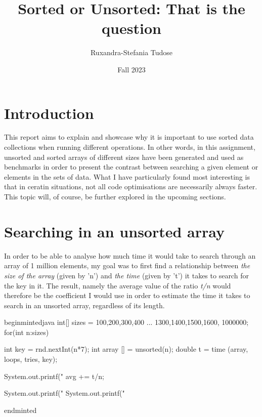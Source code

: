 \documentclass[a4paper,11pt]{article}
\begin{document}
\title{
    \textbf{Sorted or Unsorted: That is the question}
}
\author{Ruxandra-Stefania Tudose}
\date{Fall 2023}

\maketitle

\section*{Introduction}

This report aims to explain and showcase why it is important to use sorted data collections when running different operations. 
In other words, in this assignment, unsorted and sorted arrays of different sizes have been generated and used as benchmarks in order 
to present the contrast between searching a given element or 
elements in the sets of data. What I have particularly found most interesting is that 
in ceratin situations, not all code optimisations are necessarily always faster. This topic will, of course, be further explored in the upcoming sections. 

\section*{Searching in an unsorted array}

In order to be able to analyse how much time it would take to search through an array of 1 million elements, my goal 
was to first find a relationship between \textit{the size of the array} (given by 'n') and \textit{the time} (given by 't') it takes to search for 
the key in it. 
The result, namely the average value of the ratio \textit{t/n} would therefore be the coefficient I would use in order to estimate the time 
it takes to search in an unsorted array, regardless of its length. 

begin{minted}{java}
int[] sizes = {100,200,300,400 ... 1300,1400,1500,1600, 1000000};
for(int n:sizes) {
            
    int key = rnd.nextInt(n*7);
    int array [] = unsorted(n);
    double t = time (array, loops, tries, key);

    System.out.printf("%
    avg += t/n;

}
    System.out.printf("%
    System.out.printf("%

end{minted}
\end{document}
